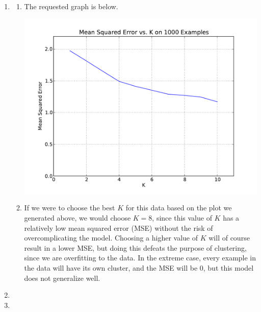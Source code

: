 \documentclass[solution, letterpaper]{cs121}
\begin{document}
\begin{enumerate}
	\item 
		\begin{enumerate}
			\item The requested graph is below.
				\begin{center}
				\includegraphics[scale=0.8]{mse-vs-k.pdf}
				\end{center}
			\item If we were to choose the best $K$ for this data based on the plot we generated above, we would choose $K = 8$, since this value of $K$ has a relatively low mean squared error (MSE) without the risk of overcomplicating the model. Choosing a higher value of $K$ will of course result in a lower MSE, but doing this defeats the purpose of clustering, since we are overfitting to the data. In the extreme case, every example in the data will have its own cluster, and the MSE will be 0, but this model does not generalize well.
		\end{enumerate}
	\item
	\item
\end{enumerate}
\end{document}
